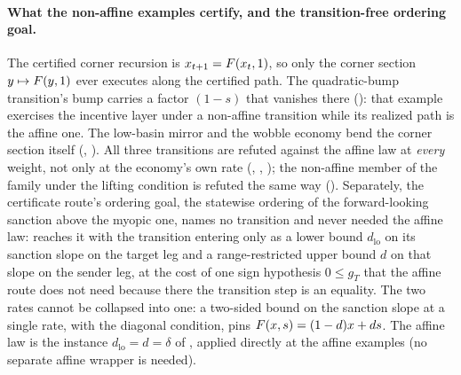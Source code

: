 \paragraph{What the non-affine examples certify, and the transition-free
ordering goal.}
\label{app:witness:grading}
The certified corner recursion is $x_{t+1}=F(x_t,1)$, so only the corner
section $y\mapsto F(y,1)$ ever executes along the certified path. The
quadratic-bump transition's bump carries a factor $(1-s)$ that vanishes
there (): that example exercises the
incentive layer under a non-affine transition while its realized path is
the affine one. The low-basin mirror and the wobble economy bend the corner
section itself (,
). All three transitions are refuted
against the affine law at \emph{every} weight, not only at the economy's
own rate (, ,
); the non-affine member of the family under the lifting condition is
refuted the same way (). Separately, the
certificate route's ordering goal, the statewise ordering of the
forward-looking sanction above the myopic one, names no
transition and never needed the affine law: 
reaches it with the transition entering only as a lower bound
$d_{\mathrm{lo}}$ on its sanction slope on the target leg and a range-restricted upper bound
$d$ on that slope on the sender leg, at the cost of one sign hypothesis $0\le g_T$
that the affine route does not need because there the transition step is an
equality. The two rates cannot be collapsed into one: a two-sided bound on the sanction slope at a
single rate, with the diagonal condition, pins $F(x,s)=(1-d)x+ds$. The
affine law is the instance $d_{\mathrm{lo}}=d=\delta$ of
, applied directly at the affine examples (no separate affine wrapper is needed).

